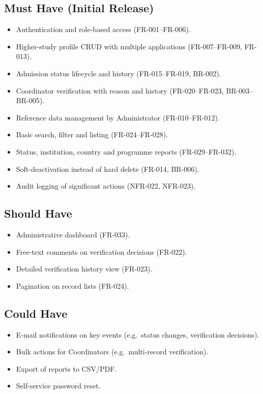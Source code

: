 \documentclass[11pt,a4paper]{article}
\begin{document}
\subsection*{Must Have (Initial Release)}
\begin{itemize}
  \item Authentication and role-based access (FR-001--FR-006).
  \item Higher-study profile CRUD with multiple applications (FR-007--FR-009, FR-013).
  \item Admission status lifecycle and history (FR-015--FR-019, BR-002).
  \item Coordinator verification with reason and history (FR-020--FR-023, BR-003--BR-005).
  \item Reference data management by Administrator (FR-010--FR-012).
  \item Basic search, filter and listing (FR-024--FR-028).
  \item Status, institution, country and programme reports (FR-029--FR-032).
  \item Soft-deactivation instead of hard delete (FR-014, BR-006).
  \item Audit logging of significant actions (NFR-022, NFR-023).
\end{itemize}

\subsection*{Should Have}
\begin{itemize}
  \item Administrative dashboard (FR-033).
  \item Free-text comments on verification decisions (FR-022).
  \item Detailed verification history view (FR-023).
  \item Pagination on record lists (FR-024).
\end{itemize}

\subsection*{Could Have}
\begin{itemize}
  \item E-mail notifications on key events (e.g.\ status changes, verification decisions).
  \item Bulk actions for Coordinators (e.g.\ multi-record verification).
  \item Export of reports to CSV/PDF.
  \item Self-service password reset.
\end{itemize}
\end{document}
